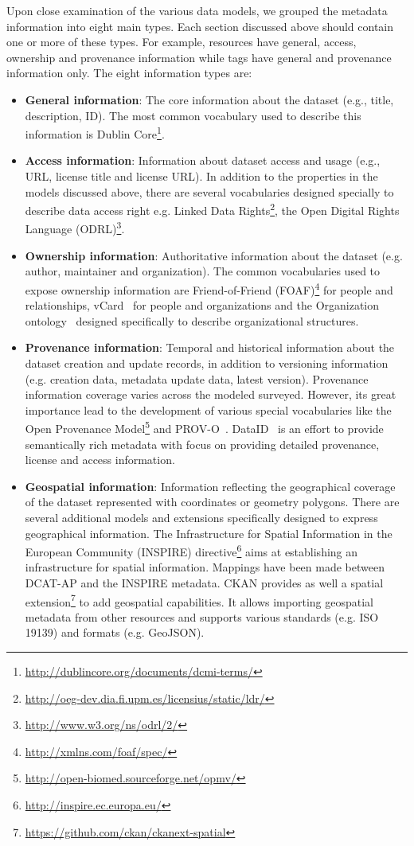 Upon close examination of the various data models, we grouped the metadata information into eight main types. Each section discussed above should contain one or more of these types. For example, resources have general, access, ownership and provenance information while tags have general and provenance information only. The eight information types are:
\begin{itemize}
 \item \textbf{General information}: The core information about the dataset (e.g., title, description, ID). The most common vocabulary used to describe this information is Dublin Core\footnote{\url{http://dublincore.org/documents/dcmi-terms/}}.
 \item \textbf{Access information}: Information about dataset access and usage (e.g., URL, license title and license URL). In addition to the properties in the models discussed above, there are several vocabularies designed specially to describe data access right e.g. Linked Data Rights\footnote{\url{http://oeg-dev.dia.fi.upm.es/licensius/static/ldr/}}, the Open Digital Rights Language (ODRL)\footnote{\url{http://www.w3.org/ns/odrl/2/}}.
 \item \textbf{Ownership information}: Authoritative information about the dataset (e.g. author, maintainer and organization). The common vocabularies used to expose ownership information are Friend-of-Friend (FOAF)\footnote{\url{http://xmlns.com/foaf/spec/}} for people and relationships, vCard~\cite{Iannella:W3C:14} for people and organizations and the Organization ontology~\cite{Reynolds:W3C:14} designed specifically to describe organizational structures.
 \item \textbf{Provenance information}: Temporal and historical information about the dataset creation and update records, in addition to versioning information (e.g. creation data, metadata update data, latest version). Provenance information coverage varies across the modeled surveyed. However, its great importance lead to the development of various special vocabularies like the Open Provenance Model\footnote{\url{http://open-biomed.sourceforge.net/opmv/}} and PROV-O~\cite{Lebo:W3C:13}. DataID~\cite{Brummer::ICSS:14} is an effort to provide semantically rich metadata with focus on providing detailed provenance, license and access information.
 \item \textbf{Geospatial information}: Information reflecting the geographical coverage of the dataset represented with coordinates or geometry polygons. There are several additional models and extensions specifically designed to express geographical information. The Infrastructure for Spatial Information in the European Community (INSPIRE) directive\footnote{\url{http://inspire.ec.europa.eu/}} aims at establishing an infrastructure for spatial information. Mappings have been made between DCAT-AP and the INSPIRE metadata. CKAN provides as well a spatial extension\footnote{\url{https://github.com/ckan/ckanext-spatial}} to add geospatial capabilities. It allows importing geospatial metadata from other resources and supports various standards (e.g. ISO 19139) and formats (e.g. GeoJSON).

\end{itemize}
